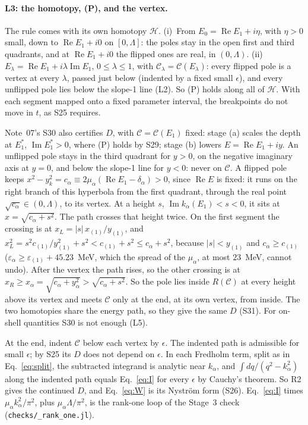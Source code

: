 \documentclass[11pt]{article}
\newcommand{\file}[1]{\nolinkurl{#1}}
\begin{document}
\paragraph{L3: the homotopy, (P), and the vertex.} The rule comes with its own homotopy $\mathcal H$. (i)~From $E_0=\operatorname{Re}E_1+i\eta$, with $\eta>0$ small, down to $\operatorname{Re}E_1+i0$ on $[0,\Lambda]$: the poles stay in the open first and third quadrants, and at $\operatorname{Re}E_1+i0$ the flipped ones are real, in $(0,\Lambda)$. (ii)~$E_\lambda=\operatorname{Re}E_1+i\lambda\operatorname{Im}E_1$, $0\le\lambda\le1$, with $\mathcal C_\lambda=\mathcal C(E_\lambda)$: every flipped pole is a vertex at every $\lambda$, passed just below (indented by a fixed small $\epsilon$), and every unflipped pole lies below the slope-1 line (L2). So (P) holds along all of $\mathcal H$. With each segment mapped onto a fixed parameter interval, the breakpoints do not move in $t$, as S25 requires.

Note~07's S30 also certifies $D$, with $\mathcal C=\mathcal C(E_1)$ fixed: stage (a) scales the depth at $E_1^*$, $\operatorname{Im}E_1^*>0$, where (P) holds by S29; stage (b) lowers $E=\operatorname{Re}E_1+iy$. An unflipped pole stays in the third quadrant for $y>0$, on the negative imaginary axis at $y=0$, and below the slope-1 line for $y<0$: never on $\mathcal C$. A flipped pole keeps $x^2-y_k^2=c_\alpha\equiv2\mu_\alpha(\operatorname{Re}E_1-\delta_\alpha)>0$, since $\operatorname{Re}E$ is fixed: it runs on the right branch of this hyperbola from the first quadrant, through the real point $\sqrt{c_\alpha}\in(0,\Lambda)$, to its vertex. At a height $s$, $\operatorname{Im}k_\alpha(E_1)<s<0$, it sits at $x=\sqrt{c_\alpha+s^2}$. The path crosses that height twice. On the first segment the crossing is at $x_L=|s|\,x_{(1)}/y_{(1)}$, and $x_L^2=s^2c_{(1)}/y_{(1)}^2+s^2<c_{(1)}+s^2\le c_\alpha+s^2$, because $|s|<y_{(1)}$ and $c_\alpha\ge c_{(1)}$ ($\varepsilon_\alpha\ge\varepsilon_{(1)}+45.23$~MeV, which the spread of the $\mu_\alpha$, at most $23$~MeV, cannot undo). After the vertex the path rises, so the other crossing is at $x_R\ge x_\alpha=\sqrt{c_\alpha+y_\alpha^2}>\sqrt{c_\alpha+s^2}$. So the pole lies inside $R(\mathcal C)$ at every height above its vertex and meets $\mathcal C$ only at the end, at its own vertex, from inside. The two homotopies share the energy path, so they give the same $D$ (S31). For on-shell quantities S30 is not enough (L5).

At the end, indent $\mathcal C$ below each vertex by $\epsilon$. The indented path is admissible for small $\epsilon$; by S25 its $D$ does not depend on $\epsilon$. In each Fredholm term, split as in Eq.~\eqref{eq:split}, the subtracted integrand is analytic near $k_\alpha$, and $\int dq/(q^2-k_\alpha^2)$ along the indented path equals Eq.~\eqref{eq:I} for every $\epsilon$ by Cauchy's theorem. So R2 gives the continued $D$, and Eq.~\eqref{eq:W} is its Nystr\"om form (S26). Eq.~\eqref{eq:I} times $\mu_\alpha k_\alpha^2/\pi^2$, plus $\mu_\alpha\Lambda/\pi^2$, is the rank-one loop of the Stage~3 check (\file{checks/_rank_one.jl}).
\end{document}
